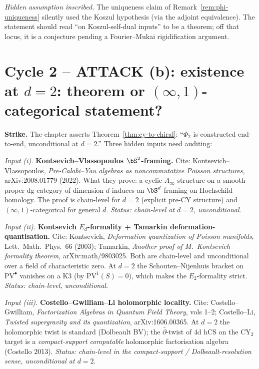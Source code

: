 \documentclass[11pt]{article}
\theoremstyle{definition}
\providecommand{\Ainf}{A_\infty}
\providecommand{\PV}{\mathrm{PV}}
\begin{document}
\emph{Hidden assumption inscribed.} The uniqueness claim of
Remark~\ref{rem:phi-uniqueness} silently used the Koszul hypothesis
(via the adjoint equivalence). The statement should read
``on Koszul-self-dual inputs'' to be a theorem;
off that locus, it is a conjecture pending a Fourier--Mukai
rigidification argument.

\section*{Cycle 2 -- ATTACK (b): existence at $d = 2$: theorem or
$(\infty,1)$-categorical statement?}

\noindent\textbf{Strike.} The chapter asserts
Theorem~\ref{thm:cy-to-chiral}: ``$\Phi_2$ is constructed end-to-end,
unconditional at $d = 2$.'' Three hidden inputs need auditing:

\smallskip
\emph{Input (i).} \textbf{Kontsevich--Vlassopoulos $\bS^2$-framing.}
Cite: Kontsevich--Vlassopoulos, \emph{Pre-Calabi--Yau algebras as
noncommutative Poisson structures}, arXiv:2008.01779 (2022). What
they prove: a cyclic $\Ainf$-structure on a smooth proper dg-category
of dimension $d$ induces an $\bS^d$-framing on Hochschild homology. The
proof is chain-level for $d = 2$ (explicit pre-CY structure) and
$(\infty,1)$-categorical for general $d$. \emph{Status: chain-level at
$d = 2$, unconditional}.

\emph{Input (ii).} \textbf{Kontsevich $E_d$-formality + Tamarkin
deformation-quantisation.} Cite: Kontsevich, \emph{Deformation
quantization of Poisson manifolds}, Lett.\ Math.\ Phys.\ 66 (2003);
Tamarkin, \emph{Another proof of M.\ Kontsevich formality theorem},
arXiv:math/9803025. Both are chain-level and unconditional over a
field of characteristic zero. At $d = 2$ the Schouten--Nijenhuis
bracket on $\PV^\bullet$ vanishes on a K3 (by $\PV^1(S) = 0$), which
makes the $E_2$-formality strict. \emph{Status: chain-level,
unconditional}.

\emph{Input (iii).} \textbf{Costello--Gwilliam--Li holomorphic
locality.} Cite: Costello--Gwilliam, \emph{Factorization Algebras in
Quantum Field Theory}, vols 1--2; Costello--Li,
\emph{Twisted supergravity and its quantization}, arXiv:1606.00365.
At $d = 2$ the holomorphic twist is standard (Dolbeault BV); the
$\bar\partial$-twist of 4d hCS on the CY$_2$ target is a
\emph{compact-support computable} holomorphic factorisation algebra
(Costello 2013). \emph{Status: chain-level in the compact-support /
Dolbeault-resolution sense, unconditional at $d = 2$}.
\end{document}
